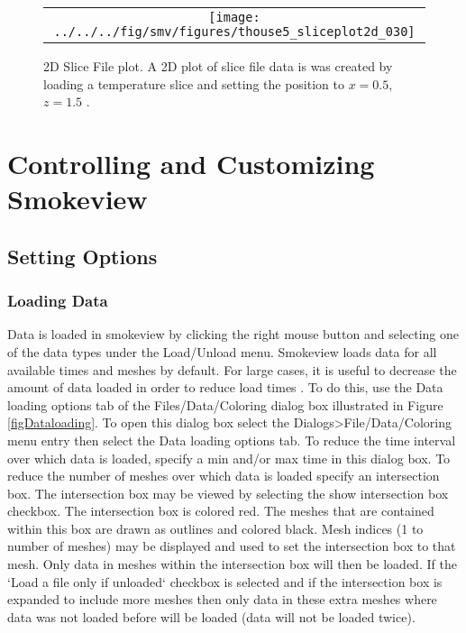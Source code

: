 \documentclass[11pt,twoside]{book}
\begin{document}
\begin{figure}[htbp]
\begin{center}
\begin{tabular}{c}
\texttt{[image: ../../../fig/smv/figures/thouse5\_sliceplot2d\_030]}
\end{tabular}
\end{center}
\caption{2D Slice File plot. A 2D plot of slice file data is was created
by loading a temperature slice and setting the position to $x=0.5$, $z=1.5$ .}
\label{fig:plot2d_sliceplot}%
\end{figure}


\part{Controlling and Customizing Smokeview}

\chapter{Setting Options}
\label{chapter:settingoptions}
\section{Loading Data}

Data is loaded in smokeview by clicking the right mouse button and selecting one of the data types
under the Load/Unload menu. Smokeview loads data for all available times and meshes by default.
For large cases, it is useful to decrease the amount of data loaded in order to reduce load times .
To do this, use the Data loading options tab of the Files/Data/Coloring dialog box
illustrated in Figure \ref{figDataloading}.
To open this dialog box select the Dialogs>File/Data/Coloring menu entry then select the Data loading options tab.
To reduce the time interval over which
data is loaded, specify a min and/or max time in this dialog box.
To reduce the number of meshes over which
data is loaded specify an intersection box.
The intersection box may be viewed by selecting the show intersection box checkbox.
The intersection box is colored red. The meshes that are contained within this box
are drawn as outlines and colored black. Mesh indices (1 to number of meshes) may be displayed and used
to set the intersection box to that mesh.
Only data in meshes within the intersection box will
then be loaded.
If the `Load a file only if unloaded` checkbox is selected and if the intersection box
is expanded to include more meshes then only data in these extra meshes where data was not loaded before will be loaded
(data will not be loaded twice).
\end{document}
